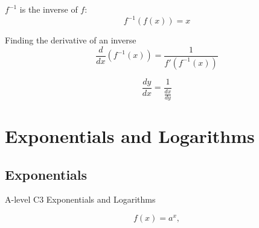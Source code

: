 \documentclass[11pt,a4paper,oneside]{book}
\begin{document}
\begin{definition}
$f^{-1}$ is the inverse of $f$: $$f^{-1}(f(x))=x$$
\end{definition}


\begin{thing}{Finding the derivative of an inverse}
$$\frac{d}{dx}\left(f^{-1}(x)\right)=\frac{1}{f'(f^{-1}(x))}$$
\end{thing}

\begin{in_a_box}
$$\frac{dy}{dx}=\frac{1}{\frac{dx}{dy}}$$
\end{in_a_box}

\chapter{Exponentials and Logarithms}
\section{Exponentials}
\begin{gce}
A-level C3 Exponentials and Logarithms
\end{gce}
 \[f(x)=a^{x},\]
 
\end{document}
